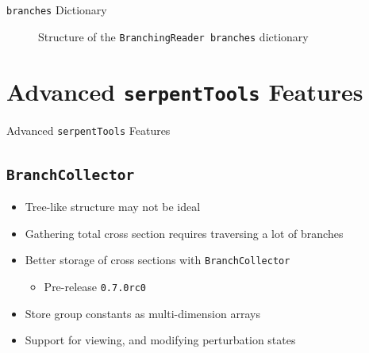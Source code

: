 \documentclass{beamer}
\newcommand{\st}{\texttt{serpentTools} }
\begin{document}
\begin{frame}{\texttt{branches} Dictionary}
    \begin{figure}
        \caption{Structure of the \texttt{BranchingReader branches} dictionary}
    \end{figure}
\end{frame}

\section{Advanced \st Features}

\begin{frame}{Advanced \st Features}
    \tableofcontents[sectionstyle=show/hide,subsectionstyle=show/show/hide]
\end{frame}

\subsection{\texttt{BranchCollector}}

\begin{frame}{}
    \begin{itemize}
        \item{Tree-like structure may not be ideal}
        \item Gathering total cross section requires traversing a lot of branches
        \item{Better storage of cross sections with \texttt{BranchCollector}}
        \begin{itemize}
            \item Pre-release \texttt{0.7.0rc0}
        \end{itemize}
        \item{Store group constants as multi-dimension arrays}
        \item{Support for viewing, and modifying perturbation states}
    \end{itemize}
\end{frame}
\end{document}
